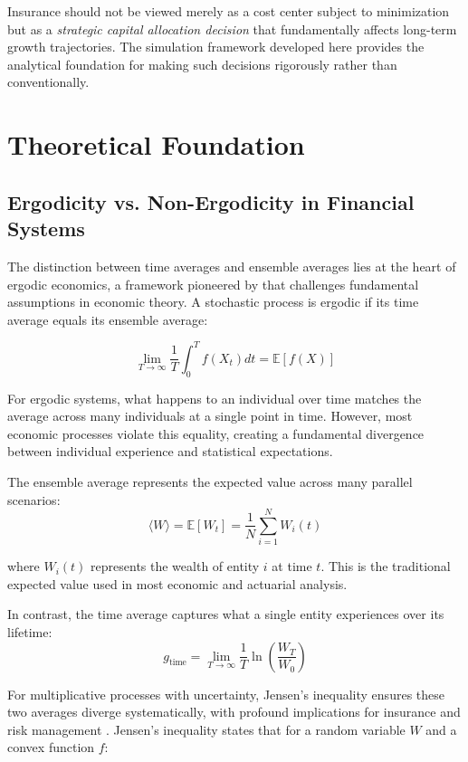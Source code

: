 \documentclass[11pt,letterpaper]{article}
\newcommand{\E}{\mathbb{E}}
\begin{document}
Insurance should not be viewed merely as a cost center subject to minimization but as a \emph{strategic capital allocation decision} that fundamentally affects long-term growth trajectories. The simulation framework developed here provides the analytical foundation for making such decisions rigorously rather than conventionally.

\section{Theoretical Foundation}

\subsection{Ergodicity vs. Non-Ergodicity in Financial Systems}

The distinction between time averages and ensemble averages lies at the heart of ergodic economics, a framework pioneered by \citet{peters2019ergodicity} that challenges fundamental assumptions in economic theory. A stochastic process is ergodic if its time average equals its ensemble average:

\begin{equation}
\lim_{T \to \infty} \frac{1}{T} \int_0^T f(X_t) dt = \E[f(X)]
\end{equation}

For ergodic systems, what happens to an individual over time matches the average across many individuals at a single point in time. However, most economic processes violate this equality, creating a fundamental divergence between individual experience and statistical expectations.

The ensemble average represents the expected value across many parallel scenarios:
\begin{equation}
\langle W \rangle = \E[W_t] = \frac{1}{N} \sum_{i=1}^{N} W_i(t)
\end{equation}

where $W_i(t)$ represents the wealth of entity $i$ at time $t$. This is the traditional expected value used in most economic and actuarial analysis.

In contrast, the time average captures what a single entity experiences over its lifetime:
\begin{equation}
g_{\text{time}} = \lim_{T \to \infty} \frac{1}{T} \ln\left(\frac{W_T}{W_0}\right)
\end{equation}

For multiplicative processes with uncertainty, Jensen's inequality ensures these two averages diverge systematically, with profound implications for insurance and risk management \citep{peters2016evaluating}. Jensen's inequality states that for a random variable $W$ and a convex function $f$:
\end{document}
